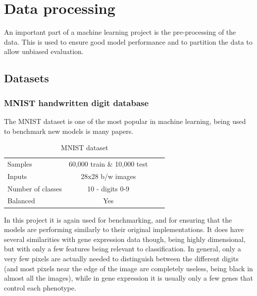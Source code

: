 \documentclass[12pt,a4paper,twoside,openright]{report}
\begin{document}
\section{Data processing}
An important part of a machine learning project is the pre-processing of the data. This is used to ensure good model performance and 
to partition the data to allow unbiased evaluation.

\subsection{Datasets}
\subsubsection{MNIST handwritten digit database}
The MNIST dataset is one of the most popular in machine learning, being used to benchmark new models is many papers.
\begin{table}[H]
  \label{tab:mnist}
  \small %
  \centering %
  \begin{tabular}{lccr} %
  \toprule[\heavyrulewidth]
  Samples & 60,000 train \& 10,000 test \\
  Inputs & 28x28 b/w images  \\
  Number of classes & 10 - digits 0-9 \\
  Balanced & Yes \\
  \bottomrule[\heavyrulewidth] 
  \end{tabular}
  \caption{MNIST dataset} 
\end{table}

In this project it is again used for benchmarking, and for ensuring that the models are performing similarly to their original implementations.
It does have several similarities with gene expression data though, being highly dimensional, but with only a few features being relevant to 
classification. In general, only a very few pixels are actually needed to distinguish between the different digits (and most pixels near the 
edge of the image are completely useless, being black in almost all the images), while in gene expression it is usually only a few genes 
that control each phenotype.
\end{document}
